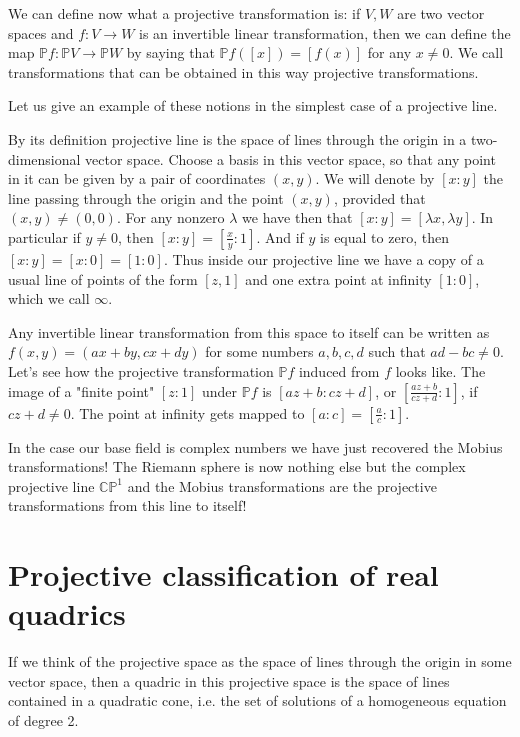{{We can define now what a projective transformation is: if $V,W$ are two vector spaces and $f:V\rightarrow W$ is an invertible linear transformation, then we can define the map $\mathbb{P}f:\mathbb{P}V\rightarrow\mathbb{P}{W}$ by saying that $\mathbb{P}f([x])=[f(x)]$ for any $x\neq 0$. We call transformations that can be obtained in this way projective transformations.

Let us give an example of these notions in the simplest case of a projective line.

By its definition projective line is the space of lines through the origin in a two-dimensional vector space. Choose a basis in this vector space, so that any point in it can be given by a pair of coordinates $(x,y)$. We will denote by $[x:y]$ the line passing through the origin and the point $(x,y)$, provided that $(x,y)\neq (0,0)$. For any nonzero $\lambda$ we have then that $[x:y]=[\lambda x, \lambda y]$. In particular if $y\neq 0$, then $[x:y]=[\frac x y:1]$. And if $y$ is equal to zero, then $[x:y]=[x:0]=[1:0]$. Thus inside our projective line we have a copy of a usual line of points of the form $[z,1]$ and one extra point at infinity $[1:0]$, which we call $\infty$.

Any invertible linear transformation from this space to itself can be written as $f(x,y)=(a x+ b y, c x + d y)$ for some numbers $a,b,c,d$ such that $ad-bc \neq 0$. Let's see how the projective transformation $\mathbb{P}f$ induced from $f$ looks like. The image of a "finite point" $[z:1]$ under $\mathbb{P}f$ is $[a z + b: c z + d]$, or $[\frac{az+b}{cz+d}:1]$, if $cz+d \neq 0$. The point at infinity gets mapped to $[a:c]=[\frac a c:1]$.

In the case our base field is complex numbers we have just recovered the Mobius transformations! The Riemann sphere is now nothing else but the complex projective line $\mathbb{CP}^1$ and the Mobius transformations are the projective transformations from this line to itself!

\section{Projective classification of real quadrics}

If we think of the projective space as the space of lines through the origin in some vector space, then a quadric in this projective space is the space of lines contained in a quadratic cone, i.e. the set of solutions of a homogeneous equation of degree 2.

}}
